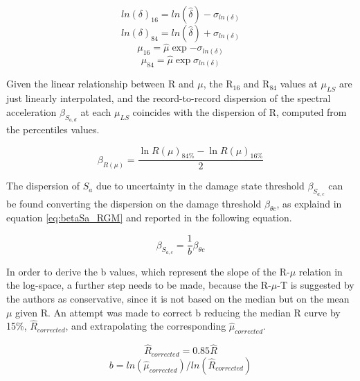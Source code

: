\begin{equation}
ln(\delta)_{16} = ln(\hat{\delta})-\sigma_{ln(\delta)}
\end{equation}
\begin{equation}
ln(\delta)_{84} = ln(\hat{\delta})+\sigma_{ln(\delta)}
\end{equation}
\begin{equation}
\mu_{16} = \hat{\mu} \exp{-\sigma_{ln(\delta)}}
\end{equation}
\begin{equation}
\mu_{84} = \hat{\mu} \exp{\sigma_{ln(\delta)}}
\end{equation}

Given the linear relationship between R and $\mu$, the R$_{16}$ and R$_84$ values at $\mu_{LS}$ are just linearly interpolated, and the record-to-record dispersion of the spectral acceleration $\beta_{S_{a, d}}$ at each $\mu_{LS}$ coincides with the dispersion of R, computed from the percentiles values.

\begin{equation}
\label{eq:beta_DF}
\beta_{R(\mu)} = \frac{\ln R(\mu)_{84\%} - \ln R(\mu)_{16\%}}{2}
\end{equation} 

The dispersion of $S_{a}$ due to uncertainty in the damage state threshold $\beta_{S_{a, c}}$ can be found converting the dispersion on the damage threshold $\beta_{\theta c}$, as explaind in equation \ref{eq:betaSa_RGM} and reported in the following equation.

\begin{equation}
\label{eq:betasc_DF}
\beta_{S_{a, c}} = \frac{1}{b} \beta_{\theta c}
\end{equation}

In order to derive the b values, which represent the slope of the R-$\mu$ relation in the log-space, a further step needs to be made, because the R-$\mu$-T is suggested by the authors as conservative, since it is not based on the median but on the mean $\mu$ given R. An attempt was made to correct b reducing the median R curve by 15\%, $\hat{R}_{corrected}$, and extrapolating the corresponding $\hat{\mu}_{corrected}$.

\begin{equation}
\hat{R}_{corrected}=0.85\hat{R}
\end{equation}
\begin{equation}
\label{eq:bcorrected_DF}
b=ln(\hat{\mu}_{corrected})/ln(\hat{R}_{corrected})
\end{equation}

